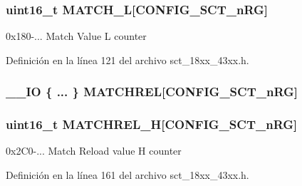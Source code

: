 \subsubsection[{\texorpdfstring{M\+A\+T\+C\+H\+\_\+L}{MATCH_L}}]{ uint16\+\_\+t M\+A\+T\+C\+H\+\_\+L\mbox{[}{\bf C\+O\+N\+F\+I\+G\+\_\+\+S\+C\+T\+\_\+n\+RG}\mbox{]}}\hypertarget{struct_l_p_c___s_c_t___t_a181deddddb3e03ac728c0febecf09533}{}\label{struct_l_p_c___s_c_t___t_a181deddddb3e03ac728c0febecf09533}
0x180-\/... Match Value L counter 

Definición en la línea 121 del archivo sct\+\_\+18xx\+\_\+43xx.\+h.

\subsubsection[{\texorpdfstring{M\+A\+T\+C\+H\+R\+EL}{MATCHREL}}]{\setlength{\rightskip}{0pt plus 5cm}\+\_\+\+\_\+\+IO \{ ... \}   M\+A\+T\+C\+H\+R\+EL\mbox{[}{\bf C\+O\+N\+F\+I\+G\+\_\+\+S\+C\+T\+\_\+n\+RG}\mbox{]}}\hypertarget{struct_l_p_c___s_c_t___t_ac51a24aa2415befac5b95ad899ccdc22}{}\label{struct_l_p_c___s_c_t___t_ac51a24aa2415befac5b95ad899ccdc22}
\subsubsection[{\texorpdfstring{M\+A\+T\+C\+H\+R\+E\+L\+\_\+H}{MATCHREL_H}}]{ uint16\+\_\+t M\+A\+T\+C\+H\+R\+E\+L\+\_\+H\mbox{[}{\bf C\+O\+N\+F\+I\+G\+\_\+\+S\+C\+T\+\_\+n\+RG}\mbox{]}}\hypertarget{struct_l_p_c___s_c_t___t_a865ba2ba1895487fe9efbe536c7d3a73}{}\label{struct_l_p_c___s_c_t___t_a865ba2ba1895487fe9efbe536c7d3a73}
0x2\+C0-\/... Match Reload value H counter 

Definición en la línea 161 del archivo sct\+\_\+18xx\+\_\+43xx.\+h.


